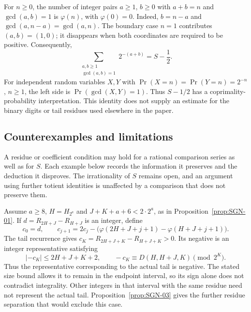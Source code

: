 \begin{prop}\label{prop:C1-inv}
For $n\ge0$, the number of integer pairs $a\ge1$, $b\ge0$ with
$a+b=n$ and $\gcd(a,b)=1$ is $\varphi(n)$, with
$\varphi(0)=0$. Indeed, $b=n-a$ and
$\gcd(a,n-a)=\gcd(a,n)$. The boundary case $n=1$ contributes
$(a,b)=(1,0)$; it disappears when both coordinates are required to
be positive. Consequently,
\[
 \sum_{\substack{a,b\ge1\\\gcd(a,b)=1}}2^{-(a+b)}=S-\frac12.
\]
For independent random variables $X,Y$ with
$\Pr(X=n)=\Pr(Y=n)=2^{-n}$, $n\ge1$, the left side is
$\Pr(\gcd(X,Y)=1)$. Thus $S-1/2$ has a coprimality-probability
interpretation. This identity does not supply an estimate for the
binary digits or tail residues used elsewhere in the paper.
\end{prop}

\subsection{Counterexamples and limitations}

A residue or coefficient condition may hold for a rational comparison
series as well as for $S$. Each example below records the information
it preserves and the deduction it disproves. The irrationality of $S$
remains open, and an argument using further totient identities is
unaffected by a comparison that does not preserve them.


\begin{obs}\label{prop:SGN-02}
Assume $a\ge8$, $H=H_{2^a}$ and
$J+K+a+6<2\cdot2^a$, as in
Proposition~\ref{prop:SGN-01}. If
$d=R_{2H+J}-R_{H+J}$ is an integer, define
\[
 c_0=d,\qquad
 c_{j+1}=2c_j-\bigl(\varphi(2H+J+j+1)-\varphi(H+J+j+1)\bigr).
\]
The tail recurrence gives
$c_K=R_{2H+J+K}-R_{H+J+K}>0$. Its negative is an integer
representative satisfying
\[
 |{-c_K}|\le2H+J+K+2,\qquad
 -c_K\equiv D(H,H+J,K)\pmod{2^K}.
\]
Thus the representative corresponding to the actual tail is negative.
The stated size bound allows it to remain in the endpoint interval,
so its sign alone does not contradict integrality. Other integers in
that interval with the same residue need not represent the actual tail.
Proposition~\ref{prop:SGN-03} gives the further residue separation
that would exclude this case.
\end{obs}


